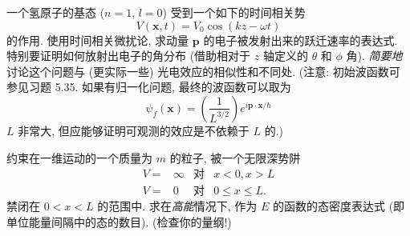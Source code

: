\documentclass{assignment}
\begin{document}
\begin{prob}[课本习题 5.38]
    一个氢原子的基态 ($n=1$, $l=0$) 受到一个如下的时间相关势
    \[
        V(\bm{x},t)=V_0\cos(kz-\omega t)
    \]
    的作用. 使用时间相关微扰论, 求动量 $\bm{p}$ 的电子被发射出来的跃迁速率的表达式. 特别要证明如何放射出电子的角分布 (借助相对于 $z$ 轴定义的 $\theta$ 和 $\phi$ 角). \textit{简要地}讨论这个问题与 (更实际一些) 光电效应的相似性和不同处. (注意: 初始波函数可参见习题 5.35. 如果有归一化问题, 最终的波函数可以取为
    \[
        \psi_f(\bm{x})=\left(\frac{1}{L^{3/2}}\right)e^{i\bm{p}\cdot\bm{x}/\hbar}
    \]
    $L$ 非常大, 但应能够证明可观测的效应是不依赖于 $L$ 的.)
\end{prob}
\begin{sol}
    
\end{sol}

\begin{prob}[课本习题 5.39]
    约束在一维运动的一个质量为 $m$ 的粒子, 被一个无限深势阱
    \begin{align*}
        V=&\infty&\text{对}&x<0,x>L\\
        V=&0&\text{对}&0\leq x\leq L.
    \end{align*}
    禁闭在 $0<x<L$ 的范围中. 求在\textit{高能}情况下, 作为 $E$ 的函数的态密度表达式 (即单位能量间隔中的态的数目). (检查你的量纲!)
\end{prob}
\begin{sol}
    
\end{sol}
\end{document}
